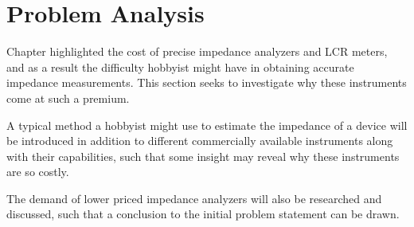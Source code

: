 \chapter{Problem Analysis} \label{ch:ProblemAnalysis}
Chapter  highlighted the cost of precise impedance analyzers and LCR meters, and as a result the difficulty hobbyist might have in obtaining accurate impedance measurements. This section seeks to investigate why these instruments come at such a premium.

A typical method a hobbyist might use to estimate the impedance of a device will be introduced in addition to different commercially available instruments along with their capabilities, such that some insight may reveal why these instruments are so costly.

The demand of lower priced impedance analyzers will also be researched and discussed, such that a conclusion to the initial problem statement can be drawn.
